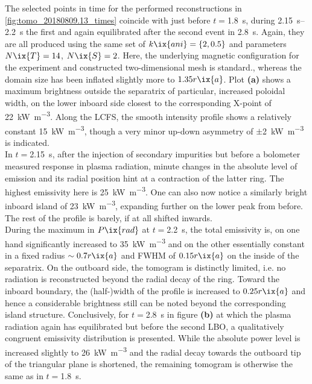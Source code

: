%
            The selected points in time for the performed reconstructions in \cref{fig:tomo_20180809.13_times} coincide with just before $t=$\SI{1.8}{\second}, during \SIrange{2.15}{2.2}{\second} the first and again equilibrated after the second event in \SI{2.8}{\second}. Again, they are all produced using the same set of $k\ix{ani}=\left\{2, 0.5\right\}$ and parameters $N\ix{T}=14$, $N\ix{S}=2$. Here, the underlying magnetic configuration for the experiment and constructed two-dimensional mesh is standard., whereas the domain size has been inflated slightly more to $1.35r\ix{a}$. Plot \textbf{(a)} shows a maximum brightness outside the separatrix of particular, increased poloidal width, on the lower inboard side closest to the corresponding X-point of \SI{22}{\kilo\watt\per\cubic\meter}. Along the LCFS, the smooth intensity profile shows a relatively constant \SI{15}{\kilo\watt\per\cubic\meter}, though a very minor up-down asymmetry of $\pm$\SI{2}{\kilo\watt\per\cubic\meter} is indicated.\\%
            In $t=$\SI{2.15}{\second}, after the injection of secondary impurities but before a bolometer measured response in plasma radiation, minute changes in the absolute level of emission and its radial position hint at a contraction of the latter ring. The highest emissivity here is \SI{25}{\kilo\watt\per\cubic\meter}. One can also now notice a similarly bright inboard island of \SI{23}{\kilo\watt\per\cubic\meter}, expanding further on the lower peak from before. The rest of the profile is barely, if at all shifted inwards.\\%
            During the maximum in $P\ix{rad}$ at $t=$\SI{2.2}{\second}, the total emissivity is, on one hand significantly increased to \SI{35}{\kilo\watt\per\cubic\meter} and on the other essentially constant in a fixed radius $\sim0.7r\ix{a}$ and FWHM of $0.15r\ix{a}$ on the inside of the separatrix. On the outboard side, the tomogram is distinctly limited, i.e. no radiation is reconstructed beyond the radial decay of the ring. Toward the inboard boundary, the (half-)width of the profile is increased to $0.25r\ix{a}$ and hence a considerable brightness still can be noted beyond the corresponding island structure. Conclusively, for $t=$\SI{2.8}{\second} in figure \textbf{(b)} at which the plasma radiation again has equilibrated but before the second LBO, a qualitatively congruent emissivity distribution is presented. While the absolute power level is increased slightly to \SI{26}{\kilo\watt\per\cubic\meter} and the radial decay towards the outboard tip of the triangular plane is shortened, the remaining tomogram is otherwise the same as in $t=$\SI{1.8}{\second}.\\%
